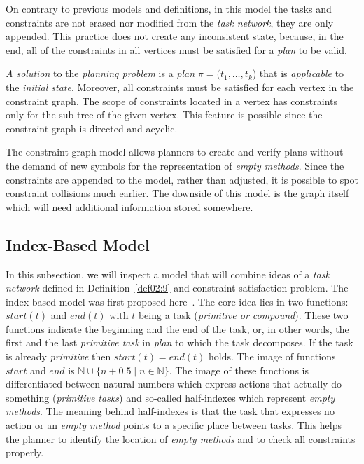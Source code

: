 \medskip\noindent
On contrary to previous models and definitions, in this model the tasks and constraints are not erased nor modified from the \emph{task network}, they are only appended. This practice does not create any inconsistent state, because, in the end, all of the constraints in all vertices must be satisfied for a \emph{plan} to be valid. 

\medskip\noindent
\emph{A solution} to the \emph{planning problem} is a \emph{plan} $\pi = (t_1, \dots, t_k$) that is \emph{applicable} to the \emph{initial state}. Moreover, all constraints must be satisfied for each vertex in the constraint graph. The scope of constraints located in a vertex has constraints only for the sub-tree of the given vertex. This feature is possible since the constraint graph is directed and acyclic.

\medskip\noindent
The constraint graph model allows planners to create and verify plans without the demand of new symbols for the representation of \emph{empty methods}. Since the constraints are appended to the model, rather than adjusted, it is possible to spot constraint collisions much earlier. The downside of this model is the graph itself which will need additional information stored somewhere.

\begin{example}\label{ex03:7}
\end{example}

\subsection{Index-Based Model}

\medskip\noindent
In this subsection, we will inspect a model that will combine ideas of a \emph{task network} defined in Definition~\ref{def02:9} and constraint satisfaction problem. The index-based model was first proposed here~\cite{ondrckova2023semantics}. The core idea lies in two functions: $start(t)$ and $end(t)$ with $t$ being a task (\emph{primitive or compound}). These two functions indicate the beginning and the end of the task, or, in other words, the first and the last \emph{primitive task} in \emph{plan} to which the task decomposes. If the task is already \emph{primitive} then $start(t) = end(t)$ holds. The image of functions $start$ and $end$ is $\mathbb{N} \cup \{n + 0.5 \; | \; n \in \mathbb{N}\}$. The image of these functions is differentiated between natural numbers which express actions that actually do something (\emph{primitive tasks}) and so-called half-indexes which represent \emph{empty methods}. The meaning behind half-indexes is that the task that expresses no action or an \emph{empty method} points to a specific place between tasks. This helps the planner to identify the location of \emph{empty methods} and to check all constraints properly.


